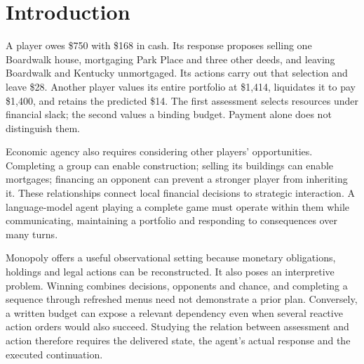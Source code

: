 \section{Introduction}
A player owes \$750 with \$168 in cash. Its response proposes selling one Boardwalk house, mortgaging Park Place and three other deeds, and leaving Boardwalk and Kentucky unmortgaged. Its actions carry out that selection and leave \$28. Another player values its entire portfolio at \$1,414, liquidates it to pay \$1,400, and retains the predicted \$14. The first assessment selects resources under financial slack; the second values a binding budget. Payment alone does not distinguish them.

Economic agency also requires considering other players' opportunities. Completing a group can enable construction; selling its buildings can enable mortgages; financing an opponent can prevent a stronger player from inheriting it. These relationships connect local financial decisions to strategic interaction. A language-model agent playing a complete game must operate within them while communicating, maintaining a portfolio and responding to consequences over many turns.

Monopoly offers a useful observational setting because monetary obligations, holdings and legal actions can be reconstructed. It also poses an interpretive problem. Winning combines decisions, opponents and chance, and completing a sequence through refreshed menus need not demonstrate a prior plan. Conversely, a written budget can expose a relevant dependency even when several reactive action orders would also succeed. Studying the relation between assessment and action therefore requires the delivered state, the agent's actual response and the executed continuation.

